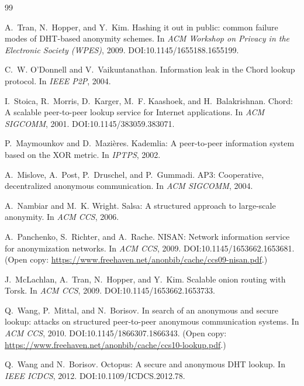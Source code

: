 \documentclass[11pt]{article}
\begin{document}
\begin{thebibliography}{99}


A.~Tran, N.~Hopper, and Y.~Kim.
\newblock Hashing it out in public: common failure modes of DHT-based anonymity schemes.
\newblock In \emph{ACM Workshop on Privacy in the Electronic Society (WPES)}, 2009.
\newblock DOI:10.1145/1655188.1655199.

C.~W. O'Donnell and V.~Vaikuntanathan.
\newblock Information leak in the Chord lookup protocol.
\newblock In \emph{IEEE P2P}, 2004.

I.~Stoica, R.~Morris, D.~Karger, M.~F. Kaashoek, and H.~Balakrishnan.
\newblock Chord: A scalable peer-to-peer lookup service for Internet applications.
\newblock In \emph{ACM SIGCOMM}, 2001.
\newblock DOI:10.1145/383059.383071.

P.~Maymounkov and D.~Mazi{\`e}res.
\newblock Kademlia: A peer-to-peer information system based on the XOR metric.
\newblock In \emph{IPTPS}, 2002.

A.~Mislove, A.~Post, P.~Druschel, and P.~Gummadi.
\newblock AP3: Cooperative, decentralized anonymous communication.
\newblock In \emph{ACM SIGCOMM}, 2004.

A.~Nambiar and M.~K. Wright.
\newblock Salsa: A structured approach to large-scale anonymity.
\newblock In \emph{ACM CCS}, 2006.

A.~Panchenko, S.~Richter, and A.~Rache.
\newblock NISAN: Network information service for anonymization networks.
\newblock In \emph{ACM CCS}, 2009.
\newblock DOI:10.1145/1653662.1653681. (Open copy: \url{https://www.freehaven.net/anonbib/cache/ccs09-nisan.pdf}.)

J.~McLachlan, A.~Tran, N.~Hopper, and Y.~Kim.
\newblock Scalable onion routing with Torsk.
\newblock In \emph{ACM CCS}, 2009.
\newblock DOI:10.1145/1653662.1653733.

Q.~Wang, P.~Mittal, and N.~Borisov.
\newblock In search of an anonymous and secure lookup: attacks on structured peer-to-peer anonymous communication systems.
\newblock In \emph{ACM CCS}, 2010.
\newblock DOI:10.1145/1866307.1866343. (Open copy: \url{https://www.freehaven.net/anonbib/cache/ccs10-lookup.pdf}.)


Q.~Wang and N.~Borisov.
\newblock Octopus: A secure and anonymous DHT lookup.
\newblock In \emph{IEEE ICDCS}, 2012.
\newblock DOI:10.1109/ICDCS.2012.78.


\end{thebibliography}
\end{document}
